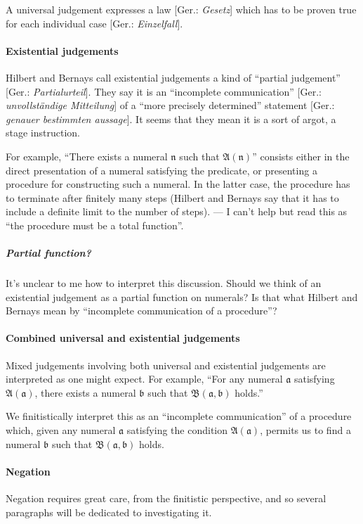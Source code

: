A universal judgement expresses a law [Ger.: \textit{Gesetz\/}] which
has to be proven true for each individual case [Ger.: \textit{Einzelfall\/}].

\paragraph{Existential judgements} %
Hilbert and Bernays call existential judgements a kind of ``partial
judgement'' [Ger.: \textit{Partialurteil\/}]. They say it is an
``incomplete communication'' [Ger.: \textit{unvollst\"{a}ndige Mitteilung\/}]
of a ``more precisely determined'' statement [Ger.: \textit{genauer bestimmten aussage\/}].
It seems that they mean it is a sort of argot, a stage instruction.

For example, ``There exists a numeral $\mathfrak{n}$ such that
$\mathfrak{A}(\mathfrak{n})$'' consists either in the direct
presentation of a numeral satisfying the predicate, or presenting a
procedure for constructing such a numeral. In the latter case, the
procedure has to terminate after finitely many steps (Hilbert and
Bernays say that it has to include a definite limit to the number of
steps). --- I can't help but read this as ``the procedure must be a
total function''.

\subparagraph{Partial function?}
It's unclear to me how to interpret this discussion. Should we think
of an existential judgement as a partial function on numerals? Is that
what Hilbert and Bernays mean by ``incomplete communication of a procedure''?

\paragraph{Combined universal and existential judgements} %
Mixed judgements involving both universal and existential judgements
are interpreted as one might expect. For example, ``For any numeral
$\mathfrak{a}$ satisfying $\mathfrak{A}(\mathfrak{a})$, there exists a
numeral $\mathfrak{b}$ such that
$\mathfrak{B}(\mathfrak{a},\mathfrak{b})$ holds.''

We finitistically interpret this as an ``incomplete communication'' of
a procedure which, given any numeral $\mathfrak{a}$ satisfying the condition
$\mathfrak{A}(\mathfrak{a})$, permits us to find a numeral
$\mathfrak{b}$ such that $\mathfrak{B}(\mathfrak{a},\mathfrak{b})$ holds.

\paragraph{Negation} %
Negation requires great care, from the finitistic perspective, and so
several paragraphs will be dedicated to investigating it.

